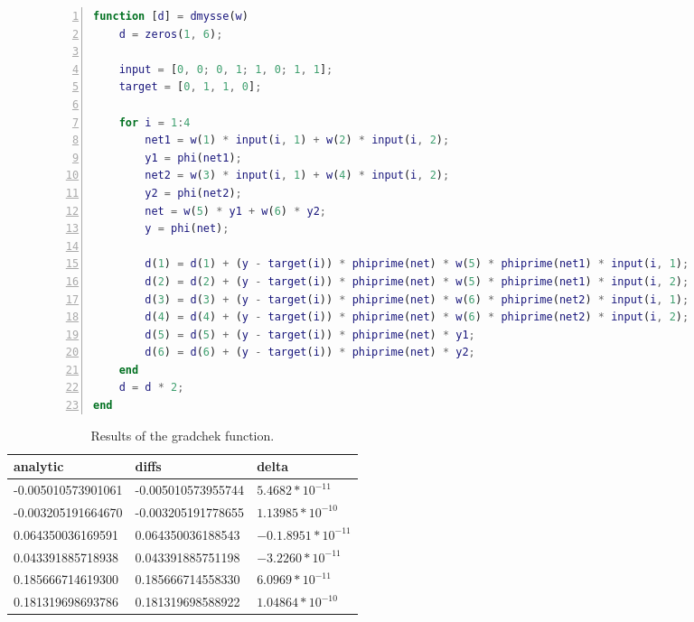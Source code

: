\documentclass{article}
\begin{document}
\begin{figure}
	\begin{lstlisting}[caption={The computation of the derivatives of the sum squared error of the weights.}, captionpos=b, language=matlab, numbers=left, tabsize=4, frame=single, basicstyle=\footnotesize, breaklines=true, deletekeywords={input}]
function [d] = dmysse(w)
	d = zeros(1, 6);

	input = [0, 0; 0, 1; 1, 0; 1, 1];
	target = [0, 1, 1, 0];

	for i = 1:4
		net1 = w(1) * input(i, 1) + w(2) * input(i, 2);
		y1 = phi(net1);
		net2 = w(3) * input(i, 1) + w(4) * input(i, 2);
		y2 = phi(net2);
		net = w(5) * y1 + w(6) * y2; 
		y = phi(net);
	
		d(1) = d(1) + (y - target(i)) * phiprime(net) * w(5) * phiprime(net1) * input(i, 1);
		d(2) = d(2) + (y - target(i)) * phiprime(net) * w(5) * phiprime(net1) * input(i, 2);
		d(3) = d(3) + (y - target(i)) * phiprime(net) * w(6) * phiprime(net2) * input(i, 1);
		d(4) = d(4) + (y - target(i)) * phiprime(net) * w(6) * phiprime(net2) * input(i, 2);
		d(5) = d(5) + (y - target(i)) * phiprime(net) * y1;
		d(6) = d(6) + (y - target(i)) * phiprime(net) * y2;
	end
	d = d * 2;
end
	\end{lstlisting}
\end{figure}

\begin{table}[!h]
	\centering
	\begin{tabular}{| l | l | l |}
		\hline
		analytic & diffs & delta \\ \hline
  -0.005010573901061 & -0.005010573955744 &  $5.4682*10^{-11}$ \\ \hline
  -0.003205191664670 & -0.003205191778655 & $1.13985*10^{-10}$ \\ \hline
   0.064350036169591 & 0.064350036188543 & $-0.1.8951*10^{-11}$ \\ \hline
   0.043391885718938 & 0.043391885751198 & $-3.2260*10^{-11}$ \\ \hline
  0.185666714619300 & 0.185666714558330 & $6.0969*10^{-11}$ \\ \hline
  0.181319698693786 & 0.181319698588922 & $1.04864*10^{-10}$ \\ \hline
	\end{tabular}
	\caption{Results of the gradchek function.}
	\label{table:gradchek}
\end{table}
\end{document}
